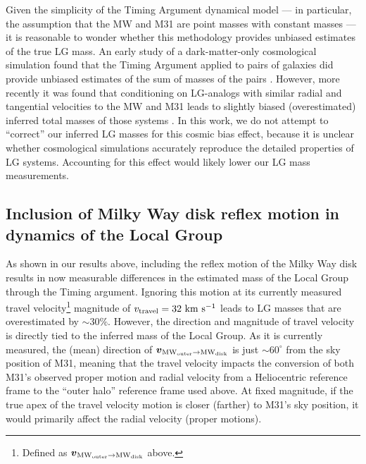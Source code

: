 \documentclass[twocolumn]{aastex631}
\newcommand{\bov}{\ensuremath{\boldsymbol{v}}}
\newcommand{\vel}[2]{\ensuremath{\bov_{\rm #1 \to #2}}}
\newcommand{\mwouter}{\ensuremath{\textrm{MW}_\textrm{outer}}}
\newcommand{\mwdisk}{\ensuremath{\textrm{MW}_\textrm{disk}}}
\begin{document}
Given the simplicity of the Timing Argument dynamical model --- in particular,
the assumption that the MW and M31 are point masses with constant masses --- it
is reasonable to wonder whether this methodology provides unbiased estimates of
the true LG mass.
An early study of a dark-matter-only cosmological simulation found that the
Timing Argument applied to pairs of galaxies did provide unbiased estimates of
the sum of masses of the pairs \citep{LiWhite2008}.
However, more recently it was found that conditioning on LG-analogs with similar
radial and tangential velocities to the MW and M31 leads to slightly biased
(overestimated) inferred total masses of those systems \citep{Gonzalez2014,
Hartl2021}.
In this work, we do not attempt to ``correct'' our inferred LG masses for this
cosmic bias effect, because it is unclear whether cosmological simulations
accurately reproduce the detailed properties of LG systems.
Accounting for this effect would likely lower our LG mass measurements.


\subsection{Inclusion of Milky Way disk reflex motion in dynamics of the Local Group}

As shown in our results above, including the reflex motion of the Milky Way disk
results in now measurable differences in the estimated mass of the Local Group
through the Timing argument.
Ignoring this motion at its currently measured travel velocity\footnote{Defined
as $\vel{\mwouter}{\mwdisk}$ above.} magnitude of $v_\textrm{travel} = 32~\mathrm{km}~\mathrm{s}^{-1}$
\citep{Petersen2021} leads to LG masses that are overestimated by $\sim30\%$.
However, the direction and magnitude of travel velocity is directly tied to the
inferred mass of the Local Group.
As it is currently measured, the (mean) direction of $\vel{\mwouter}{\mwdisk}$
is just $\sim$$60^\circ$ from the sky position of M31, meaning that the travel
velocity impacts the conversion of both M31's observed proper motion and radial
velocity from a Heliocentric reference frame to the ``outer halo'' reference
frame used above.
At fixed magnitude, if the true apex of the travel velocity motion is closer
(farther) to M31's sky position, it would primarily affect the radial velocity
(proper motions).

\end{document}
